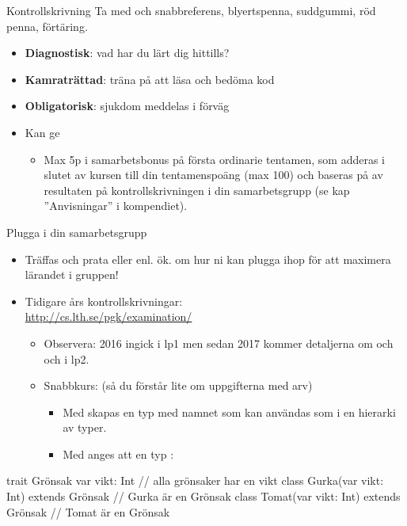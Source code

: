 


\begin{Slide}{Kontrollskrivning}
Ta med  och snabbreferens, blyertspenna, suddgummi, röd penna, förtäring.
\begin{itemize}
  \item \textbf{Diagnostisk}: vad har du lärt dig hittills?
  \item \textbf{Kamraträttad}: träna på att läsa och bedöma kod
  \item \textbf{Obligatorisk}: sjukdom  meddelas i förväg
  \item Kan ge  
  \begin{itemize}
    \item[] Max 5p i samarbetsbonus på första ordinarie tentamen, som adderas i slutet av kursen till din tentamenspoäng (max 100) och baseras på  av resultaten på kontrollskrivningen i din samarbetsgrupp (se kap ''Anvisningar'' i kompendiet).
  \end{itemize}
\end{itemize}
\end{Slide}

\begin{Slide}{Plugga i din samarbetsgrupp}
\begin{itemize}
\item Träffas och prata  eller enl. ök. om hur ni kan plugga ihop för att maximera lärandet i gruppen!
\pause
\item Tidigare års kontrollskrivningar: \\ \url{http://cs.lth.se/pgk/examination/}
\begin{itemize}
    \item Observera: 2016 ingick  i lp1 men sedan 2017 kommer detaljerna om  och  och  i lp2.
\pause
\item Snabbkurs: (så du förstår lite om uppgifterna med arv)
\begin{itemize}\SlideFontSmall
\item Med  skapas en typ med namnet  som kan användas som  i en hierarki av typer.
\item Med  anges att en typ  :
\end{itemize}

\end{itemize}

\end{itemize}
\begin{Code}
  trait Grönsak { var vikt: Int }   // alla grönsaker har en vikt
  class Gurka(var vikt: Int) extends Grönsak  // Gurka är en Grönsak
  class Tomat(var vikt: Int) extends Grönsak  // Tomat är en Grönsak
\end{Code}
\end{Slide}


